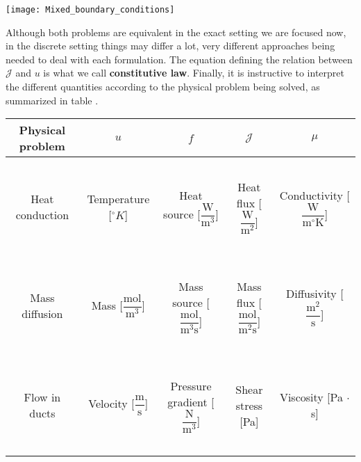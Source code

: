 \begin{marginfigure}[-5.0cm]
	\texttt{[image: Mixed\_boundary\_conditions]}
	\caption[]{Domain $\Omega$ whose boundary is partitioned into a Dirichlet and a Neumann part.} 
\end{marginfigure}
Although both problems are equivalent in the exact setting we are
focused now, in the discrete setting things may differ a lot,
very different approaches being needed to deal with each formulation.
The equation defining the relation between $\boldsymbol{\mathcal{J}}$
and $u$ is what we call \textbf{constitutive law}.
Finally, it is instructive to interpret the different
quantities according to the physical problem being solved,
as summarized in table .

\begin{table*}[ht]
\caption[]{Physical interpretation of quantities in Poisson's problem. Units in SI.}
\begin{tabular}{ c c c c c }
	\toprule
	Physical problem & $u$ & $f$ & $\boldsymbol{\mathcal{J}}$ & $\mu$  \\
	\midrule
	\multirow{3}{4em}{Heat conduction} & ~ & ~ & ~ & ~ \\
                                           & Temperature [{\footnotesize $^\circ K$}] & Heat source {\footnotesize [$\dfrac{\mbox{W}}{\mbox{m}^{3}}$]}  & Heat flux {\footnotesize [$\dfrac{\mbox{W}}{\mbox{m}^{2}}$]} & Conductivity {\footnotesize [$\dfrac{\mbox{W}}{\mbox{m} ^\circ \mbox{K}}$]} \\ 
                                           ~ & ~ & ~ & ~ & \\
	\multirow{3}{4em}{Mass diffusion} & ~ & ~ & ~& ~ \\
                                          & Mass {\footnotesize [$\dfrac{\mbox{mol}}{\mbox{m}^{3}}$]} & Mass source {\footnotesize [$\dfrac{\mbox{mol}}{\mbox{m}^{3}\mbox{s}}$]} & Mass flux {\footnotesize [$\dfrac{\mbox{mol}}{\mbox{m}^{2}\mbox{s}}$]}  & Diffusivity {\footnotesize [$\dfrac{\mbox{m}^2}{\mbox{s}}$]} \\ 
                                        ~ & ~ & ~ & ~ & \\
        \multirow{3}{4em}{Flow in ducts}  & ~ & ~ & ~& ~ \\
                                          & Velocity {\footnotesize [$\dfrac{\mbox{m}}{\mbox{s}}$]} & Pressure gradient {\footnotesize [$\dfrac{\mbox{N}}{\mbox{m}^3}$]} & Shear stress {\footnotesize [Pa]}  & Viscosity {\footnotesize [Pa $\cdot$ s]} \\ 
                                       ~  & ~ & ~ & ~ & \\
	\bottomrule
\end{tabular}
\end{table*}

